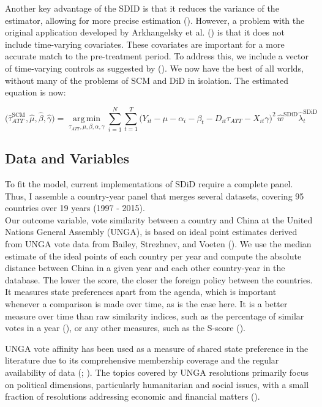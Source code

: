 \documentclass[
  12pt,
]{article}
\begin{document}
Another key advantage of the SDID is that it reduces the variance of the
estimator, allowing for more precise estimation
().
However, a problem with the original application developed by
Arkhangelsky et al. () is that
it does not include time-varying covariates. These covariates are
important for a more accurate match to the pre-treatment period. To
address this, we include a vector of time-varying controls as suggested
by (). We
now have the best of all worlds, without many of the problems of SCM and
DiD in isolation. The estimated equation is now:

\[
\bigl(\hat{\tau}_{ATT}^{\text{SCM}}, \hat{\mu}, \hat{\beta}, \hat{\gamma} \bigr)
=
\operatorname*{arg\,min}_{\tau_{ATT},\mu,\beta, \alpha, \gamma}
\sum_{i=1}^{N}\sum_{t=1}^{T}
\bigl(Y_{it}- \mu- \alpha_i - \beta_t-D_{it}\tau_{ATT} -X_{it}\gamma \bigr)^2\,
\hat{w}^{\text{SDiD}} \hat{\lambda}^{\text{SDiD}}_t
\]

\subsection{Data and Variables}\label{data-and-variables}

To fit the model, current implementations of SDiD require a complete
panel. Thus, I assemble a country-year panel that merges several
datasets, covering 95 countries over 19 years (1997 - 2015).\\
Our outcome variable, vote similarity between a country and China at the
United Nations General Assembly (UNGA), is based on ideal point
estimates derived from UNGA vote data from Bailey, Strezhnev, and Voeten
(). We use the median estimate of
the ideal points of each country per year and compute the absolute
distance between China in a given year and each other country-year in
the database. The lower the score, the closer the foreign policy between
the countries. It measures state preferences apart from the agenda,
which is important whenever a comparison is made over time, as is the
case here. It is a better measure over time than raw similarity indices,
such as the percentage of similar votes in a year
(), or any other
measures, such as the S-score
().

UNGA vote affinity has been used as a measure of shared state preference
in the literature due to its comprehensive membership coverage and the
regular availability of data (; ). The topics covered by
UNGA resolutions primarily focus on political dimensions, particularly
humanitarian and social issues, with a small fraction of resolutions
addressing economic and financial matters
().
\end{document}
